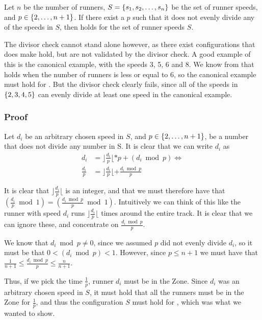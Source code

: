 Let $n$ be the number of runners, $S = \{s_1, s_2, \ldots, s_n\}$ be the set of runner speeds, and $p \in \{2, \ldots, n+1\}$. If there exist a $p$ such that it does not evenly divide any of the speeds in $S$, then  holds for the set of runner speeds $S$. 

The divisor check cannot stand alone however, as there exist configurations that does make  hold, but are not validated by the divisor check. A good example of this is the canonical example, with the speeds 3, 5, 6 and 8. We know from \cite{serra_thelonely} that  holds when the number of runners is less or equal to 6, so the canonical example must hold for . But the divisor check clearly fails, since all of the speeds in $\{2, 3, 4, 5\}$ can evenly divide at least one speed in the canonical example.


\subsubsection{Proof}
Let $d_i$ be an arbitrary chosen speed in $S$, and $p \in \{2, \ldots, n+1\}$, be a number that does not divide any number in S. It is clear that we can write $d_i$ as
\begin{equation}
\begin{split}
d_i &= \rfloor\frac{d_i}{p}\lfloor * p + (d_i \bmod p) \Leftrightarrow\\
\frac{d_i}{p} &= \rfloor\frac{d_i}{p}\lfloor + \frac{d_i \bmod p}{p}
\end{split}
\end{equation}

It is clear that $\rfloor\frac{d_i}{p}\lfloor$ is an integer, and that we must therefore have that $(\frac{d_i}{p} \bmod 1) = (\frac{d_i \bmod p}{p} \bmod 1)$. Intuitively we can think of this like the runner with speed $d_i$ runs $\rfloor \frac{d_i}{p}\lfloor$ times around the entire track. It is clear that we can ignore these, and concentrate on $\frac{d_i \bmod p}{p}$. 

We know that $d_i \bmod p \neq 0$, since we assumed $p$ did not evenly divide $d_i$, so it must be that $0 < (d_i \bmod p) < 1$. However, since $p \leq n+1$ we must have that $\frac{1}{n+1} \leq \frac{d_i \bmod p}{p} \leq \frac{n}{n+1}$.

Thus, if we pick the time $\frac{1}{p}$, runner $d_i$ must be in the Zone. Since $d_i$ was an arbitrary chosen speed in $S$, it must hold that all the runners must be in the Zone for $\frac{1}{p}$, and thus the configuration $S$ must hold for , which was what we wanted to show.

